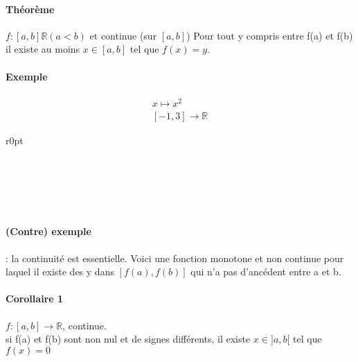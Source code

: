 \paragraph{Théorème} $f:[a, b] \mathbb{R} (a < b)$ et continue (sur $[a, b]$)
Pour tout y compris entre f(a) et f(b) il existe au moins $x\in [a, b]$ tel que $f(x) = y$.
\paragraph{Exemple} \begin{align*}
	x \mapsto x^2\\
	[-1, 3] \rightarrow \mathbb{R}
\end{align*}

\begin{wrapfigure}[5]{r}{0pt}
\end{wrapfigure}
~\\
~\\
~\\
~\\
\paragraph{(Contre) exemple} : la continuité est essentielle. 
Voici une fonction monotone et non continue pour laquel il existe des y dans $[f(a), f(b)]$ qui n'a pas d'ancédent entre a et b.
\paragraph{Corollaire 1} $f:[a, b] \rightarrow \mathbb{R}$, continue. ~\\
si f(a) et f(b) sont non nul et de signes différents, il existe $x \in ]a, b[$ tel que $f(x) = 0$

